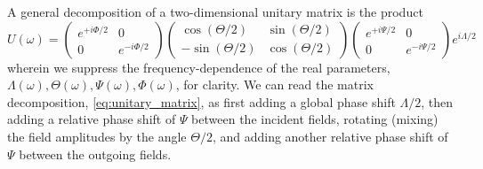 A general decomposition of a two-dimensional unitary matrix is the product~\cite[p.~95]{Leonhardt2010}
\begin{equation}
	U(\omega)
	=
	\begin{pmatrix}
		e^{+i\Phi/2} & 0 \\
		0 & e^{-i\Phi/2}
	\end{pmatrix}
	\begin{pmatrix}
		\cos(\Theta/2) & \sin(\Theta/2) \\
		-\sin(\Theta/2) & \cos(\Theta/2)
	\end{pmatrix}
	\begin{pmatrix}
		e^{+i\Psi/2} & 0 \\
		0 & e^{-i\Psi/2}
	\end{pmatrix}
	e^{i\Lambda/2}
	\label{eq:unitary_matrix}
\end{equation}
wherein we suppress the frequency-dependence of the real parameters, $\Lambda(\omega),\Theta(\omega),\Psi(\omega),\Phi(\omega)$, for clarity.
We can read the matrix decomposition, \cref{eq:unitary_matrix}, as first adding a global phase shift $\Lambda/2$, then adding a relative phase shift of $\Psi$ between the incident fields, rotating (mixing) the field amplitudes by the angle $\Theta/2$, and adding another relative phase shift of $\Psi$ between the outgoing fields.

